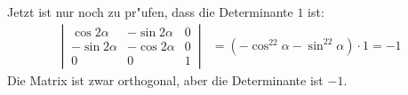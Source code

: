 \begin{loesung}
\begin{teilaufgaben}
Jetzt ist nur noch zu pr"ufen, dass die Determinante $1$ ist:
\begin{align*}
\left|\,
\begin{matrix}
 \cos2\alpha &-\sin2\alpha & 0\\
-\sin2\alpha &-\cos2\alpha & 0\\
      0      &      0      & 1
\end{matrix}\,\right|
&=(-\cos^22\alpha-\sin^22\alpha)\cdot 1=-1
\end{align*}
Die Matrix ist zwar orthogonal, aber die Determinante ist $-1$.
\qedhere
\end{teilaufgaben}
\end{loesung}

